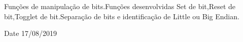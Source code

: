 Funções de manipulação de bits.\+Funções desenvolvidas Set de bit,Reset de bit,Togglet de bit.\+Separação de bits e identificação de Little ou Big Endian. \begin{DoxyDate}{Date}
17/08/2019 
\end{DoxyDate}
